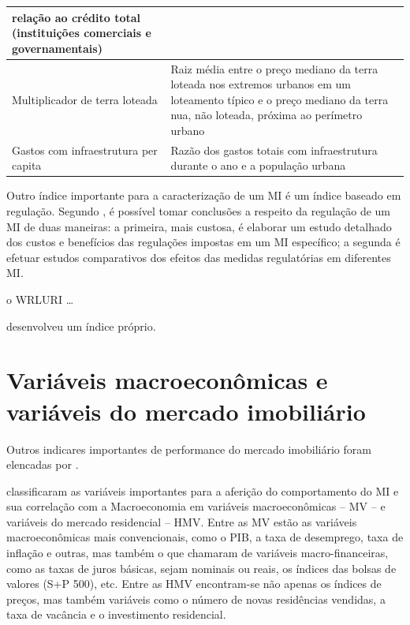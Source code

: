 \documentclass[
	12pt,				%
	oneside,			%
	a4paper,			%
	chapter=TITLE,		%
	section=TITLE,		%
	english,			%
	brazil				%
	]{abntex2}
\begin{document}
\begin{refsection}
\begin{quadro}[htb]
\begin{tabular}{|p{5cm}|p{10cm}|}
         relação ao crédito total (instituições comerciais e governamentais)  \\ \hline
         Multiplicador de terra loteada & Raiz média entre o preço mediano da terra 
         loteada nos extremos urbanos em um loteamento típico e o preço mediano da 
         terra nua, não loteada, próxima ao perímetro urbano       \\ \hline
         Gastos com infraestrutura per capita & Razão dos gastos totais com 
         infraestrutura durante o ano e a população urbana       \\ \hline
    \end{tabular}
\end{quadro}
Outro índice importante para a caracterização de um \gls{MI} é um índice baseado
em regulação. Segundo \textcite{malpezzi_affordable_2018_5}, é possível tomar conclusões a
respeito da regulação de um \gls{MI} de duas maneiras: a primeira, mais custosa,
é elaborar um estudo detalhado dos custos e benefícios das regulações impostas
em um \gls{MI} específico; a segunda é efetuar estudos comparativos dos efeitos
das medidas regulatórias em diferentes \gls{MI}.

o \gls{WRLURI} \autocite{wharton}\ldots{}

\textcite{externalities} desenvolveu um índice próprio.

\hypertarget{variuxe1veis-macroeconuxf4micas-e-variuxe1veis-do-mercado-imobiliuxe1rio}{%
\section{Variáveis macroeconômicas e variáveis do mercado imobiliário}\label{variuxe1veis-macroeconuxf4micas-e-variuxe1veis-do-mercado-imobiliuxe1rio}}

Outros indicares importantes de performance do mercado imobiliário foram
elencadas por \textcite{macroHousing}.

\textcite{macroHousing} classificaram as variáveis importantes para a aferição do
comportamento do \gls{MI} e sua correlação com a Macroeconomia em variáveis
macroeconômicas -- \gls{MV} -- e variáveis do mercado residencial -- \gls{HMV}.
Entre as \gls{MV} estão as variáveis macroeconômicas mais convencionais, como o
\gls{PIB}, a taxa de desemprego, taxa de inflação e outras, mas também o que
\textcite{macroHousing} chamaram de variáveis macro-financeiras, como as taxas de juros
básicas, sejam nominais ou reais, os índices das bolsas de valores (\gls{S+P} 500),
etc. Entre as \gls{HMV} encontram-se não apenas os índices de preços, mas também
variáveis como o número de novas residências vendidas, a taxa de vacância e o
investimento residencial.


\end{refsection}
\end{document}
